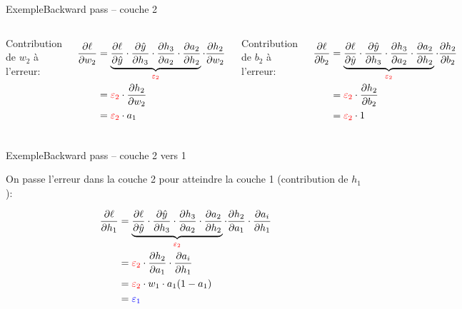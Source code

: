 \documentclass[12pt,dvipsnames,aspectratio=169]{beamer}
\begin{document}
\begin{frame}{Exemple}{Backward pass -- couche 2}

    \begin{columns}
        Contribution de $w_2$ à l'erreur:

        \begin{align*}
            \pdv{\ell}{w_2} &= \underbrace{\pdv{\ell}{\hat{y}} \cdot \pdv{\hat{y}}{h_3} \cdot \pdv{h_3}{a_2} \cdot \pdv{a_2}{h_2}}_{\color{red} \varepsilon_2} \cdot \pdv{h_2}{w_2} \\
            &= {\color{red} \varepsilon_2} \cdot \pdv{h_2}{w_2} \\
            &= {\color{red} \varepsilon_2} \cdot a_1
        \end{align*}

        Contribution de $b_2$ à l'erreur:

        \begin{align*}
            \pdv{\ell}{b_2} &= \underbrace{\pdv{\ell}{\hat{y}} \cdot \pdv{\hat{y}}{h_3} \cdot \pdv{h_3}{a_2} \cdot \pdv{a_2}{h_2}}_{\color{red} \varepsilon_2} \cdot \pdv{h_2}{b_2} \\
            &= {\color{red} \varepsilon_2} \cdot \pdv{h_2}{b_2} \\
            &= {\color{red} \varepsilon_2} \cdot 1
        \end{align*}
        
    \end{columns}

\end{frame}

\begin{frame}{Exemple}{Backward pass -- couche 2 vers 1}

    On passe l'erreur dans la couche 2 pour atteindre la couche 1 (contribution de $h_1$):

    \begin{align*}
        \pdv{\ell}{h_1} &= \underbrace{\pdv{\ell}{\hat{y}} \cdot \pdv{\hat{y}}{h_3} \cdot \pdv{h_3}{a_2} \cdot \pdv{a_2}{h_2}}_{\color{red} \varepsilon_2} \cdot \pdv{h_2}{a_1} \cdot \pdv{a_i}{h_1}\\
        &= {\color{red} \varepsilon_2} \cdot \pdv{h_2}{a_1} \cdot \pdv{a_i}{h_1} \\
        &= {\color{red} \varepsilon_2} \cdot w_1 \cdot a_1(1-a_1) \\
        &= {\color{blue} \varepsilon_1}
    \end{align*}

\end{frame}
\end{document}
